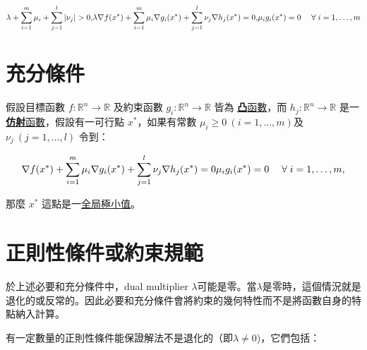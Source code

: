 \[
{\displaystyle \lambda +\sum _{i=1}^{m}\mu _{i}+\sum _{j=1}^{l}|\nu _{j}|>0,} \\
{\displaystyle \lambda \nabla f(x^{*})+\sum _{i=1}^{m}\mu _{i}\nabla g_{i}(x^{*})+\sum _{j=1}^{l}\nu _{j}\nabla h_{j}(x^{*})=0,} \\
{\displaystyle \mu _{i}g_{i}(x^{*})=0\;{\quad{\forall}}\;i=1,\ldots ,m}
\]

\section{充分條件}

假設目標函數 \({\displaystyle f:\mathbb {R} ^{n}\rightarrow \mathbb {R} }\) 及約束函數 \({\displaystyle g_{i}:\mathbb {R} ^{n}\rightarrow \mathbb {R}}\) 皆為 \href{https://zh.wikipedia.org/wiki/凸函数}{\textbf{凸}函數}，而 \({\displaystyle h_{j}:\mathbb {R} ^{n}\rightarrow \mathbb {R}}\) 是一\href{https://zh.wikipedia.org/wiki/仿射变换}{\textbf{仿射}函數}，假設有一可行點 \({\displaystyle x^{*}}\)，如果有常數 \({\displaystyle \mu _{i}\geq 0\ (i=1,\ldots ,m)}\)及 \({\displaystyle \nu _{j}\ (j=1,\ldots ,l)}\) 令到：

\[
{\displaystyle \nabla f(x^{*})+\sum _{i=1}^{m}\mu _{i}\nabla g_{i}(x^{*})+\sum _{j=1}^{l}\nu _{j}\nabla h_{j}(x^{*})=0}\\
{\displaystyle \mu _{i}g_{i}(x^{*})=0\;{\quad{\forall}}\;i=1,\ldots ,m,}
\]

那麼 \(x^*\) 這點是一\href{https://zh.wikipedia.org/wiki/极值}{全局極小值}。

\section{正則性條件或約束規範}

於上述必要和充分條件中，dual multiplier \({\displaystyle \lambda }\)可能是零。當\({\displaystyle \lambda }\)是零時，這個情況就是退化的或反常的。因此必要和充分條件會將約束的幾何特性而不是將函數自身的特點納入計算。

有一定數量的正則性條件能保證解法不是退化的（即\({\displaystyle \lambda \neq 0}\))，它們包括：

